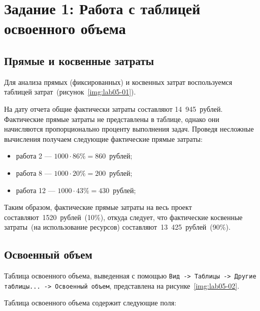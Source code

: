 \clearpage
\section{Задание 1: Работа с таблицей освоенного объема}

\subsection{Прямые и косвенные затраты}

Для анализа прямых (фиксированных) и косвенных затрат воспользуемся таблицей затрат~(рисунок~\ref{img:lab05-01}).


На дату отчета общие фактически затраты составляют 14~945~рублей. Фактические прямые затраты не представлены в таблице, однако они начисляются пропорционально проценту выполнения задач. Проведя несложные вычисления получаем следующие фактические прямые затраты:

\begin{itemize}
    \item работа 2 --- $1000 \cdot 86\% = 860$~рублей;
    \item работа 8 --- $1000 \cdot 20\% = 200$~рублей;
    \item работа 12 --- $1000 \cdot 43\% = 430$~рублей;
\end{itemize}

Таким образом, фактические прямые затраты на весь проект составляют~1520~рублей~(10\%), откуда следует, что фактические косвенные затраты~(на использование ресурсов) составляют~13~425~рублей~(90\%).

\subsection{Освоенный объем}

Таблица освоенного объема, выведенная с помощью \texttt{Вид -> Таблицы -> Другие таблицы... -> Освоенный объем}, представлена на рисунке~\ref{img:lab05-02}.


Таблица освоенного объема содержит следующие поля:

